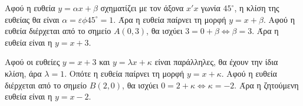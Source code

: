 
\begin{alist}
\item Αφού η ευθεία $y = \alpha x + \beta$ σχηματίζει με τον άξονα $x'x$ γωνία $45^\circ$, η κλίση της ευθείας θα είναι $\alpha = \varepsilon\phi 45^\circ = 1$. Άρα η ευθεία παίρνει τη μορφή $y = x + \beta$.
Αφού η ευθεία διέρχεται από το σημείο $A(0,3)$, θα ισχύει $3 = 0 + \beta \Leftrightarrow \beta = 3$.
Άρα η ευθεία είναι η $y = x + 3$.

\item Αφού οι ευθείες $y = x + 3$ και $y = \lambda x + \kappa$ είναι παράλληλες, θα έχουν την ίδια κλίση, άρα $\lambda = 1$. Οπότε η ευθεία παίρνει τη μορφή $y = x + \kappa$.
Αφού η ευθεία διέρχεται από το σημείο $B(2,0)$, θα ισχύει $0 = 2 + \kappa \Leftrightarrow \kappa = -2$.
Άρα η ζητούμενη ευθεία είναι η $y = x - 2$.
\end{alist}

